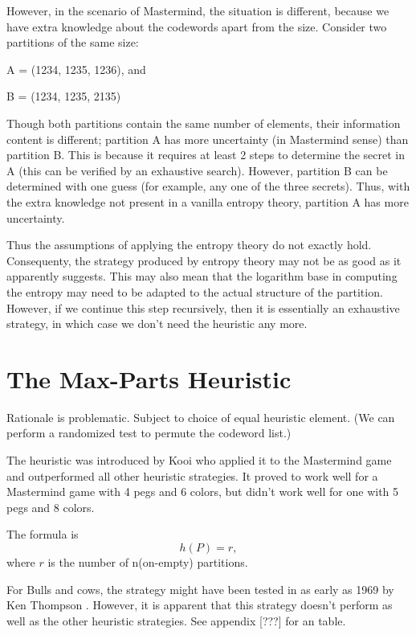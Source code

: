 However, in the scenario of Mastermind, the situation is different, because we have extra knowledge about the codewords apart from the size. Consider two partitions of the same size:

A = (1234, 1235, 1236), and

B = (1234, 1235, 2135)

Though both partitions contain the same number of elements, their information content is different; partition A has more uncertainty (in Mastermind sense) than partition B. This is because it requires at least 2 steps to determine the secret in A (this can be verified by an exhaustive search). However, partition B can be determined with one guess (for example, any one of the three secrets). Thus, with the extra knowledge not present in a vanilla entropy theory, partition A has more uncertainty.

Thus the assumptions of applying the entropy theory do not exactly hold. Consequenty, the strategy produced by entropy theory may not be as good as it apparently suggests. This may also mean that the logarithm base in computing the entropy may need to be adapted to the actual structure of the partition. However, if we continue this step recursively, then it is essentially an exhaustive strategy, in which case we don't need the heuristic any more.



\section{The Max-Parts Heuristic}

Rationale is problematic. Subject to choice of equal heuristic element. (We can perform a randomized test to permute the codeword list.)

The \maxpar{} heuristic was introduced by Kooi \cite{kooi05} who applied it to the Mastermind game and outperformed all other heuristic strategies. It proved to work well for a Mastermind game with 4 pegs and 6 colors, but didn't work well for one with 5 pegs and 8 colors.

The formula is
\[
h(P) = r ,
\]
where $r$ is the number of n(on-empty) partitions.


For Bulls and cows, the \maxpar{} strategy might have been tested in as early as 1969 by Ken Thompson \cite{ritchie01}. However, it is apparent that this strategy doesn't perform as well as the other heuristic strategies. See appendix [???] for an table.


